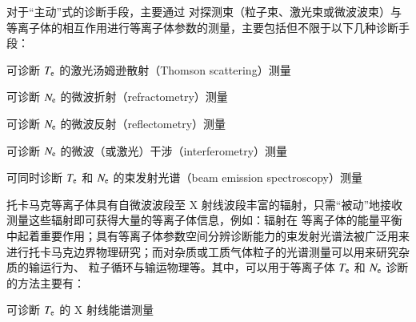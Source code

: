 对于“主动”式的诊断手段，主要通过
对探测束（粒子束、激光束或微波波束）与等离子体的相互作用进行等离子体参数的测量，主要包括但不限于以下几种诊断手段：

\hspace{0.25em}\textbullet\hspace{0.45em}可诊断 $T_{\rm e}$ 的激光汤姆逊散射（Thomson scattering）测量\cite{ThomsonScattering:1,ThomsonScattering:2,ThomsonScattering:3}

\hspace{0.25em}\textbullet\hspace{0.45em}可诊断 $N_{\rm e}$ 的微波折射（refractometry）测量\cite{refractometry}

\hspace{0.25em}\textbullet\hspace{0.45em}可诊断 $N_{\rm e}$ 的微波反射（reflectometry）测量\cite{MicrowaveReflectometry}

\hspace{0.25em}\textbullet\hspace{0.45em}可诊断 $N_{\rm e}$ 的微波\cite{MicrowaveInterferometry}（或激光\cite{LaserInterferometry}）干涉（interferometry）测量

\hspace{0.25em}\textbullet\hspace{0.45em}可同时诊断 $T_{\rm e}$ 和 $N_{\rm e}$ 的束发射光谱（beam emission spectroscopy）\cite{Li-beam,Schmitz2008}测量



托卡马克等离子体具有自微波波段至 X 射线波段丰富的辐射，只需“被动”地接收测量这些辐射即可获得大量的等离子体信息，例如：辐射\cite{Bolometer:DIIID:radiatedPower,Bolometer:JET:radiatedPower}在 等离子体的能量平衡中起着重要作用；具有等离子体参数空间分辨诊断能力的束发射光谱法被广泛用来进行托卡马克边界物理研究\cite{BES:PPCF:1993}；而对杂质或工质气体粒子的光谱测量可以用来研究杂质的输运行为\cite{HT7:CarbonTransport}、 粒子循环与输运物理\cite{ParticleTransport:PPCF:2009}等。其中，可以用于等离子体 $T_{\rm e}$ 和 $N_{\rm e}$ 诊断的方法主要有：

\hspace{0.25em}\textbullet\hspace{0.45em}可诊断 $T_{\rm e}$ 的 X 射线能谱测量\cite{Xray-spectrum-Te-Ti}

